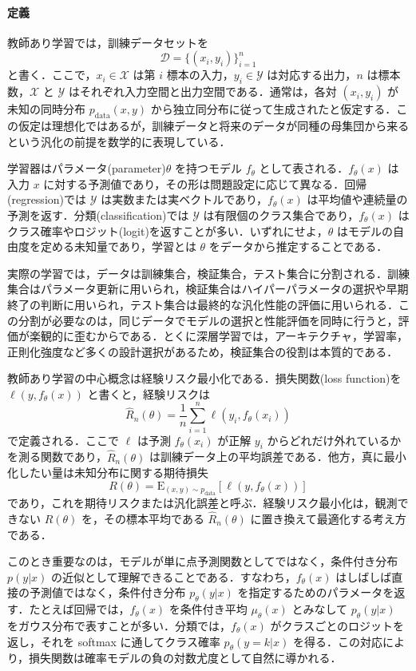 \paragraph*{定義}
教師あり学習では，訓練データセットを
\[
\mathcal D = \{(x_i,y_i)\}_{i=1}^n
\]
と書く．ここで，$x_i \in \mathcal X$ は第 $i$ 標本の入力，$y_i \in \mathcal Y$ は対応する出力，$n$ は標本数，$\mathcal X$ と $\mathcal Y$ はそれぞれ入力空間と出力空間である．通常は，各対 $(x_i,y_i)$ が未知の同時分布 $p_{\mathrm{data}}(x,y)$ から独立同分布に従って生成されたと仮定する．この仮定は理想化ではあるが，訓練データと将来のデータが同種の母集団から来るという汎化の前提を数学的に表現している．

学習器はパラメータ(parameter)$\theta$ を持つモデル $f_\theta$ として表される．$f_\theta(x)$ は入力 $x$ に対する予測値であり，その形は問題設定に応じて異なる．回帰(regression)では $\mathcal Y$ は実数または実ベクトルであり，$f_\theta(x)$ は平均値や連続量の予測を返す．分類(classification)では $\mathcal Y$ は有限個のクラス集合であり，$f_\theta(x)$ はクラス確率やロジット(logit)を返すことが多い．いずれにせよ，$\theta$ はモデルの自由度を定める未知量であり，学習とは $\theta$ をデータから推定することである．

実際の学習では，データは訓練集合，検証集合，テスト集合に分割される．訓練集合はパラメータ更新に用いられ，検証集合はハイパーパラメータの選択や早期終了の判断に用いられ，テスト集合は最終的な汎化性能の評価に用いられる．この分割が必要なのは，同じデータでモデルの選択と性能評価を同時に行うと，評価が楽観的に歪むからである．とくに深層学習では，アーキテクチャ，学習率，正則化強度など多くの設計選択があるため，検証集合の役割は本質的である．

教師あり学習の中心概念は経験リスク最小化である．損失関数(loss function)を $\ell(y,f_\theta(x))$ と書くと，経験リスクは
\[
\hat R_n(\theta)= \frac{1}{n}\sum_{i=1}^n \ell(y_i,f_\theta(x_i))
\]
で定義される．ここで $\ell$ は予測 $f_\theta(x_i)$ が正解 $y_i$ からどれだけ外れているかを測る関数であり，$\hat R_n(\theta)$ は訓練データ上の平均誤差である．他方，真に最小化したい量は未知分布に関する期待損失
\[
R(\theta)= \mathrm{E}_{(x,y)\sim p_{\mathrm{data}}}\left[\ell(y,f_\theta(x))\right]
\]
であり，これを期待リスクまたは汎化誤差と呼ぶ．経験リスク最小化は，観測できない $R(\theta)$ を，その標本平均である $\hat R_n(\theta)$ に置き換えて最適化する考え方である．

このとき重要なのは，モデルが単に点予測関数としてではなく，条件付き分布 $p(y|x)$ の近似として理解できることである．すなわち，$f_\theta(x)$ はしばしば直接の予測値ではなく，条件付き分布 $p_\theta(y|x)$ を指定するためのパラメータを返す．たとえば回帰では，$f_\theta(x)$ を条件付き平均 $\mu_\theta(x)$ とみなして
$p_\theta(y|x)$ をガウス分布で表すことが多い．分類では，$f_\theta(x)$ がクラスごとのロジットを返し，それを softmax に通してクラス確率 $p_\theta(y=k|x)$ を得る．この対応により，損失関数は確率モデルの負の対数尤度として自然に導かれる．

